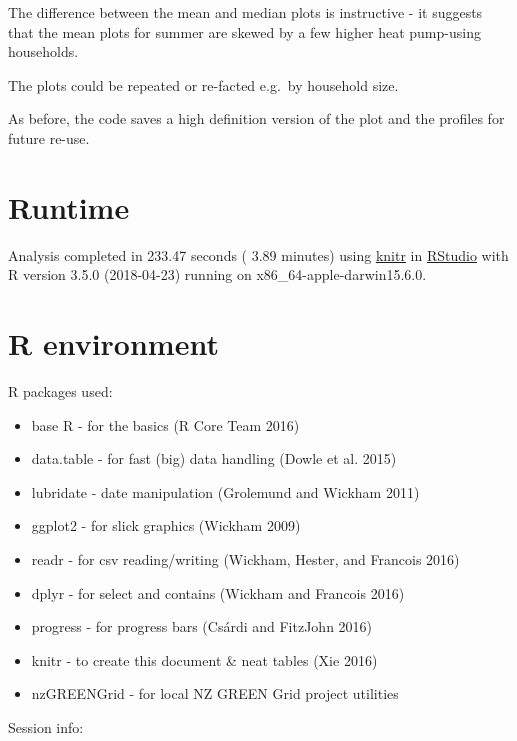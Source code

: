 \documentclass[]{article}
\providecommand{\tightlist}{%
  \setlength{\itemsep}{0pt}\setlength{\parskip}{0pt}}
\begin{document}
The difference between the mean and median plots is instructive - it
suggests that the mean plots for summer are skewed by a few higher heat
pump-using households.

The plots could be repeated or re-facted e.g.~by household size.

As before, the code saves a high definition version of the plot and the
profiles for future re-use.

\section{Runtime}\label{runtime}

Analysis completed in 233.47 seconds ( 3.89 minutes) using
\href{https://cran.r-project.org/package=knitr}{knitr} in
\href{http://www.rstudio.com}{RStudio} with R version 3.5.0 (2018-04-23)
running on x86\_64-apple-darwin15.6.0.

\section{R environment}\label{r-environment}

R packages used:

\begin{itemize}
\tightlist
\item
  base R - for the basics (R Core Team 2016)
\item
  data.table - for fast (big) data handling (Dowle et al. 2015)
\item
  lubridate - date manipulation (Grolemund and Wickham 2011)
\item
  ggplot2 - for slick graphics (Wickham 2009)
\item
  readr - for csv reading/writing (Wickham, Hester, and Francois 2016)
\item
  dplyr - for select and contains (Wickham and Francois 2016)
\item
  progress - for progress bars (Csárdi and FitzJohn 2016)
\item
  knitr - to create this document \& neat tables (Xie 2016)
\item
  nzGREENGrid - for local NZ GREEN Grid project utilities
\end{itemize}

Session info:
\end{document}
